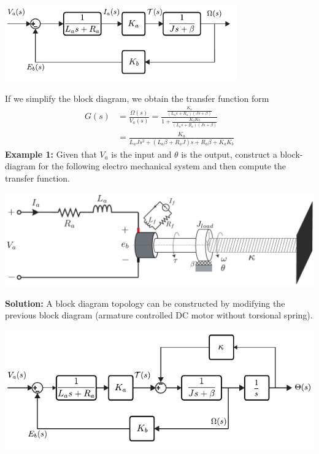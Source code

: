 \documentclass[twoside]{article}
\begin{document}
  \begin{minipage}[h]{1\linewidth}
    \begin{center}
      \includegraphics[width=0.75\textwidth]{arm_block}
    \end{center}
  \end{minipage} 
  
  If we simplify the block diagram, we obtain the transfer function form
   \begin{align*}
   	G(s) &= \frac{\Omega(s)}{V_a(s)} = \frac{\frac{K_a}{(L_a s + R_a) (J s + \beta)} }{1 + \frac{K_a K_b}{(L_a s + R_a) (J s + \beta)}}
	\\
	&= \frac{K_a}{L_a J s^2 + ( L_a \beta + R_a J ) s + R_a \beta
          + K_a K_b}
   \end{align*}
   \textbf{Example 1:} Given that $V_a$ is the input and $\theta$ is the output, construct a block-diagram for the following electro mechanical system and then compute the transfer function.
  
    \begin{minipage}[h]{1\linewidth}
    \begin{center}
      \includegraphics[width=1\textwidth]{DC_Mot_ex1}
    \end{center}
  \end{minipage} 
  
    \textbf{Solution:} A block diagram topology can be constructed by modifying the previous block diagram (armature controlled DC motor without torsional spring).
  
    \begin{minipage}[h]{1\linewidth}
    \begin{center}
      \includegraphics[width=1\textwidth]{block_ex1}
    \end{center}
  \end{minipage} 
  
\end{document}
